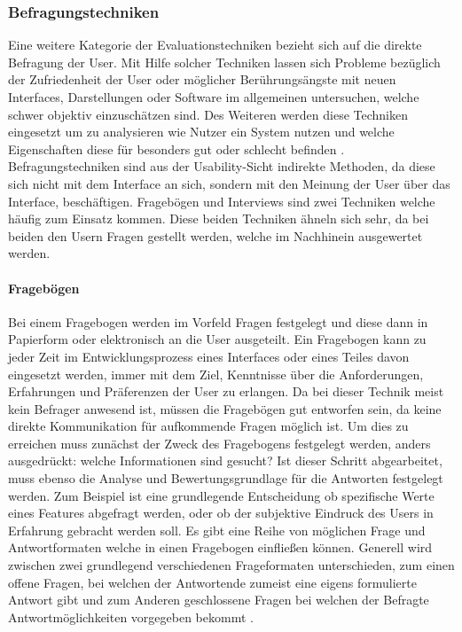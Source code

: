 \documentclass[draft=false
              ,paper=a4
              ,twoside=false
              ,fontsize=11pt
              ,headsepline
              ,BCOR10mm
              ,DIV11
              ]{scrbook}
\begin{document}
\subsubsection{Befragungstechniken} %
\label{ssub:befragungstechniken}
Eine weitere Kategorie der Evaluationstechniken bezieht sich auf die direkte Befragung der User. Mit Hilfe solcher Techniken lassen sich Probleme bezüglich der Zufriedenheit der User oder möglicher Berührungsängste mit neuen Interfaces, Darstellungen oder Software im allgemeinen untersuchen, welche schwer objektiv einzuschätzen sind. Des Weiteren werden diese Techniken eingesetzt um zu analysieren wie Nutzer ein System nutzen und welche Eigenschaften diese für besonders gut oder schlecht befinden \cite{nielsen_usability_1994}. Befragungstechniken sind aus der Usability-Sicht indirekte Methoden, da diese sich nicht mit dem Interface an sich, sondern mit den Meinung der User über das Interface, beschäftigen. Fragebögen und Interviews sind zwei Techniken welche häufig zum Einsatz kommen. Diese beiden Techniken ähneln sich sehr, da bei beiden den Usern Fragen gestellt werden, welche im Nachhinein ausgewertet werden. 

\paragraph{Fragebögen} %
\label{par:fragebögen}
Bei einem Fragebogen werden im Vorfeld Fragen festgelegt und diese dann in Papierform oder elektronisch an die User ausgeteilt. Ein Fragebogen kann zu jeder Zeit im Entwicklungsprozess eines Interfaces oder eines Teiles davon eingesetzt werden, immer mit dem Ziel, Kenntnisse über die Anforderungen, Erfahrungen und Präferenzen der User zu erlangen. Da bei dieser Technik meist kein Befrager anwesend ist, müssen die Fragebögen gut entworfen sein, da keine direkte Kommunikation für aufkommende Fragen möglich ist. Um dies zu erreichen muss zunächst der Zweck des Fragebogens festgelegt werden, anders ausgedrückt: welche Informationen sind gesucht? Ist dieser Schritt abgearbeitet, muss ebenso die Analyse und Bewertungsgrundlage für die Antworten festgelegt werden. Zum Beispiel ist eine grundlegende Entscheidung ob spezifische Werte eines Features abgefragt werden, oder ob der subjektive Eindruck des Users in Erfahrung gebracht werden soll.
Es gibt eine Reihe von möglichen Frage und Antwortformaten welche in einen Fragebogen einfließen können. Generell wird zwischen zwei grundlegend verschiedenen Frageformaten unterschieden, zum einen offene Fragen, bei welchen der Antwortende zumeist eine eigens formulierte Antwort gibt und zum Anderen geschlossene Fragen bei welchen der Befragte Antwortmöglichkeiten vorgegeben bekommt \cite{ader_advising_2008}.
\end{document}
